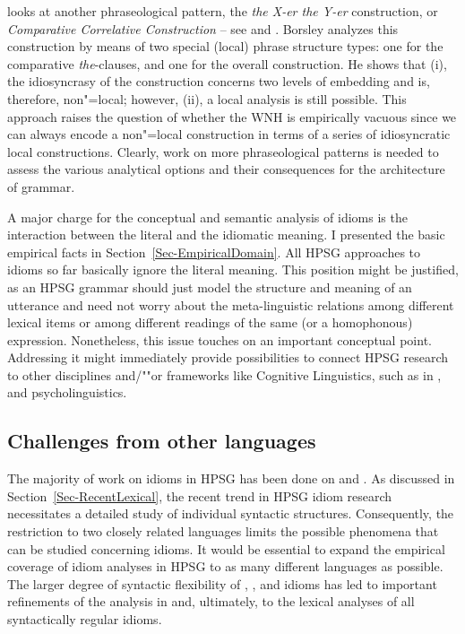 \documentclass[output=paper,biblatex,babelshorthands,newtxmath,draftmode,colorlinks,citecolor=brown]{langscibook}
\begin{document}
\citet{Borsley2004a} looks at another phraseological pattern, the \emph{the X-er the Y-er}
construction, or \emph{Comparative Correlative Construction} -- see
 and
\crossrefchapterw[\pageref{udc:page-correlatives-start}--\pageref{udc:page-correlatives-end}]{udc}.
Borsley analyzes this construction by means of two special (local) phrase structure types: one for
the comparative \emph{the}-clauses, and one for the overall construction. He shows that (i), the
idiosyncrasy of the construction concerns two levels of embedding and is, therefore, non"=local;
however, (ii), a local analysis is still possible. This approach raises the question of whether the
WNH is empirically vacuous since we can always encode a non"=local construction in terms of a series
of idiosyncratic local constructions.  Clearly, work on more phraseological patterns is needed to
assess the various analytical options and their consequences for the architecture of grammar.

A major charge for the conceptual and semantic analysis of idioms is the interaction between the
literal and the idiomatic meaning.  I presented the basic empirical facts in
Section~\ref{Sec-EmpiricalDomain}.  All HPSG approaches to idioms so far basically ignore the
literal meaning.  This position might be justified, as an HPSG grammar should just model the
structure and meaning of an utterance and need not worry about the meta-linguistic relations among
different lexical items or among different readings of the same (or a homophonous) expression.
Nonetheless, this issue touches on an important conceptual point.  Addressing it might immediately
provide possibilities to connect HPSG research to other disciplines and/""or frameworks like
Cognitive Linguistics, such as in \citet{Dobrovolskij:Piirainen:05}, and psycholinguistics.



\subsection{Challenges from other languages}
\label{Sec-OtherLanguages}

The majority of work on idioms in HPSG has been done on  and . 
As discussed in Section~\ref{Sec-RecentLexical}, the recent trend in HPSG idiom research necessitates a detailed study of individual syntactic structures. 
Consequently, the restriction to two closely related languages limits the possible phenomena that can be studied concerning idioms. 
It would be essential to expand the empirical coverage of idiom analyses in HPSG to as many different languages as possible. 
The larger degree of syntactic flexibility of , , and  idioms \citep{Ruwet:91,NSW94a,Schenk:95} has led to important refinements of the analysis in \citet{NSW94a} and, ultimately, to the lexical analyses of all syntactically regular idioms. 
\end{document}
